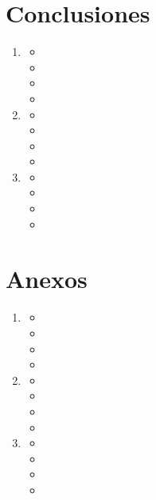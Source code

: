 \documentclass{article}
\begin{document}
    \section*{Conclusiones}
        \begin{enumerate}
            \item
            \begin{itemize}
                \item 
                \item 
                \item 
                \item 
            \end{itemize}
            \item
            \begin{itemize}
                \item 
                \item 
                \item 
                \item 
            \end{itemize}
            \item 
            \begin{itemize}
                \item 
                \item 
                \item 
                \item 
            \end{itemize}
        \end{enumerate}

    \section*{Anexos}
        \begin{enumerate}
            \item
            \begin{itemize}
                \item 
                \item 
                \item 
                \item 
            \end{itemize}
            \item
            \begin{itemize}
                \item 
                \item 
                \item 
                \item 
            \end{itemize}
            \item 
            \begin{itemize}
                \item 
                \item 
                \item 
                \item 
            \end{itemize}
        \end{enumerate}
\end{document}
